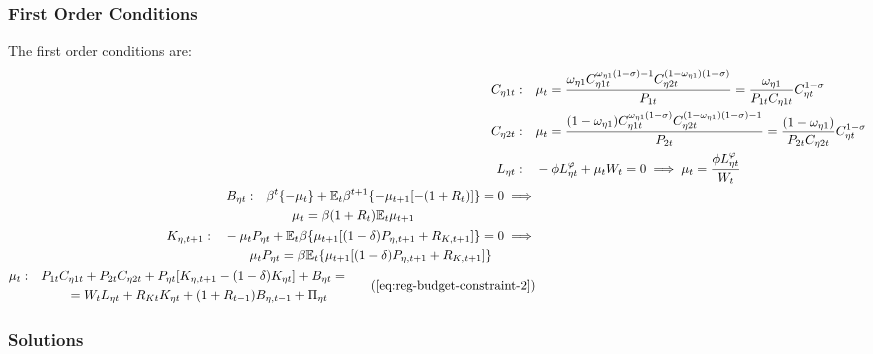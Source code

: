 \documentclass[../thesis.tex]{subfiles}
\begin{document}
\subsubsection*{First Order Conditions}

The first order conditions are:
\begin{align}
	C_{\eta 1 t}: \quad & \mu_t = \frac{\omega_{\eta 1} C_{\eta 1 t}^{\omega_{\eta 1} (1 -\sigma) -1} C_{\eta 2 t}^{(1 -\omega_{\eta 1})(1 -\sigma)}}{P_{1 t}} = \frac{\omega_{\eta 1}}{P_{1 t} C_{\eta 1 t}} C_{\eta t}^{1 -\sigma} \label{eq:reg-FOC-C1-eta-t} 
	\\
	C_{\eta 2 t}: \quad & \mu_t = \frac{(1 -\omega_{\eta 1}) C_{\eta 1 t}^{\omega_{\eta 1} (1 -\sigma)} C_{\eta 2 t}^{(1 -\omega_{\eta 1})(1 -\sigma)-1}}{P_{2 t}} = \frac{(1 -\omega_{\eta 1})}{P_{2 t} C_{\eta 2 t}} C_{\eta t}^{1 -\sigma} \label{eq:reg-FOC-C-2-eta-t} 
	\\
	L_{\eta t}: \quad & -\phi L_{\eta t}^{\varphi} +\mu_t W_t = 0 \implies \mu_t = \frac{\phi L_{\eta t}^{\varphi}}{W_t} \label{eq:reg-household-FOC-Lt} 
	\\
	\begin{split}
		B_{\eta t}: \quad & \beta^t \{-\mu_t\} + \E \beta^{t+1} \{ -\mu_{t+1} [-(1 + R_{t})] \} = 0 \implies \\ & \qquad \mu_t = \beta (1 + R_{t}) \E{ \mu_{t+1}}
	\end{split} \label{eq:reg-FOC-Bt}
	\\
	\begin{split}
		K_{\eta, t+1}: \quad & -\mu_t P_{\eta t} + \mathbb{E}_t \beta \{ \mu_{t+1} [(1-\delta) P_{\eta, t+1} + R_{K,t+1}] \} = 0 \implies \\ & \qquad \mu_t P_{\eta t} = \beta \mathbb{E}_t \{ \mu_{t+1} [(1-\delta) P_{\eta, t+1} + R_{K,t+1}] \}
	\end{split} \label{eq:reg-household-FOC-Kt} \\
	\begin{split}
		\mu_t: \quad & P_{1 t} C_{\eta 1 t} + P_{2 t} C_{\eta 2 t} + P_{\eta t} [ K_{\eta, t+1} - (1-\delta)K_{\eta t} ] + B_{\eta t} = \\ & \qquad = W_t L_{\eta t} + R_{Kt} K_{\eta t} + (1 + R_{t-1}) B_{\eta,t-1} + \Pi_{\eta t}
	\end{split} \tag{\ref{eq:reg-budget-constraint-2}}
\end{align}

\subsubsection*{Solutions}
\end{document}
